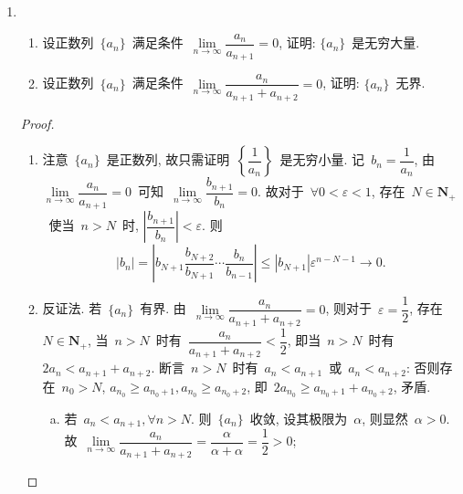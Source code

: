 \documentclass[UTF8,a4paper,11pt,twoside]{book}
\begin{document}
\begin{enumerate}
\begin{proof}
\begin{enumerate}[(1)]
			            而~$y_n=n(x_n-x_{n-1})=n\cdot(-1)^{n+1}\dfrac{1}{n}=(-1)^{n+1}$~显然发散.

			      \item 若~$\{y_n\}$~收敛, 设其极限为~$B$, 则由~Stolz~定理, 有
			            \[
				            \lim\limits_{n\to\infty} \dfrac{x_n}{1+\dfrac{1}{2}+\cdots+\dfrac{1}{n}}=\lim\limits_{n\to\infty} \dfrac{x_n-x_{n-1}}{\dfrac{1}{n}}=\lim\limits_{n\to\infty} y_n=B.
			            \]
			            注意~$\{x_n\}$~收敛因而有界, $1+\dfrac{1}{2}+\cdots+\dfrac{1}{n}$~是无穷大量, 故~$B=\lim\limits_{n\to\infty} \dfrac{x_n}{1+\dfrac{1}{2}+\cdots+\dfrac{1}{n}}=0$, 即~$\lim\limits_{n\to\infty} y_n=0$. \qedhere
		      \end{enumerate}
	      \end{proof}
	\item
	      \begin{enumerate}[(1)]
		      \item 设正数列~$\{a_n\}$~满足条件~$\lim\limits_{n\to\infty} \dfrac{a_n}{a_{n+1}}=0$, 证明: $\{a_n\}$~是无穷大量.
		      \item 设正数列~$\{a_n\}$~满足条件~$\lim\limits_{n\to\infty} \dfrac{a_n}{a_{n+1}+a_{n+2}}=0$, 证明: $\{a_n\}$~无界.
	      \end{enumerate}
	      \begin{proof}
		      \begin{enumerate}[(1)]
			      \item 注意~$\{a_n\}$~是正数列, 故只需证明~$\left\{\dfrac{1}{a_n}\right\}$~是无穷小量. 记~$b_n=\dfrac{1}{a_n}$, 由~$\lim\limits_{n\to\infty} \dfrac{a_n}{a_{n+1}}=0$~可知~$\lim\limits_{n\to\infty} \dfrac{b_{n+1}}{b_n}=0$. 故对于~$\forall 0<\varepsilon<1$, 存在~$N\in\mathbf{N}_{+}$~使当~$n>N$~时, $\left|\dfrac{b_{n+1}}{b_{n}}\right|<\varepsilon$. 则
			            \[
				            |b_n|=\left|b_{N+1}\dfrac{b_{N+2}}{b_{N+1}}\cdots\dfrac{b_n}{b_{n-1}}\right|\leqslant|b_{N+1}|\varepsilon^{n-N-1}\to 0.
			            \]
			      \item 反证法. 若~$\{a_n\}$~有界. 由~$\lim\limits_{n\to\infty} \dfrac{a_n}{a_{n+1}+a_{n+2}}=0$, 则对于~$\varepsilon=\dfrac{1}{2}$, 存在~$N\in\mathbf{N}_{+}$, 当~$n>N$~时有~$\dfrac{a_n}{a_{n+1}+a_{n+2}}<\dfrac{1}{2}$, 即当~$n>N$~时有~$2a_n<a_{n+1}+a_{n+2}$. 断言~$n>N$~时有~$a_n<a_{n+1}$~或~$a_n<a_{n+2}$: 否则存在~$n_0>N$, $a_{n_0}\geqslant a_{n_0+1}, a_{n_0}\geqslant a_{n_0+2}$, 即~$2a_{n_0}\geqslant a_{n_0+1}+a_{n_0+2}$, 矛盾.
			            \begin{enumerate}[(a)]
				            \item 若~$a_n<a_{n+1}, \forall n>N$. 则~$\{a_n\}$~收敛, 设其极限为~$\alpha$, 则显然~$\alpha>0$. 故~$\lim\limits_{n\to\infty} \dfrac{a_n}{a_{n+1}+a_{n+2}}=\dfrac{\alpha}{\alpha+\alpha}=\dfrac{1}{2}>0$;

\end{enumerate}
\end{enumerate}
\end{proof}
\end{enumerate}
\end{document}
